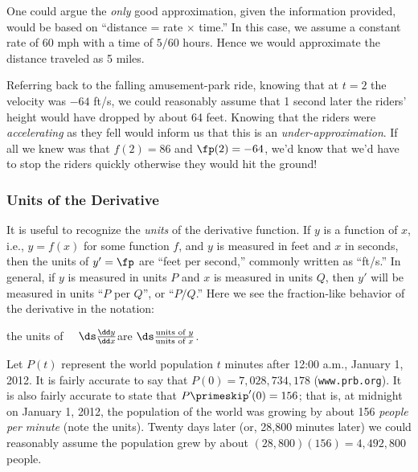 One could argue the \emph{only} good approximation, given the information provided, would be based on ``distance = rate $\times$ time.'' In this case, we assume a constant rate of 60 mph with a time of $5/60$ hours. Hence we would approximate the distance traveled as 5 miles.\bigskip


Referring back to the falling amusement-park ride, knowing that at $t=2$ the velocity was $-64$ ft/s, we could reasonably assume that 1 second later the riders' height would have dropped by about 64 feet. Knowing that the riders were \emph{accelerating} as they fell would inform us that this is an \emph{under-approximation}. If all we knew was that $f(2) = 86$ and $\fp(2) = -64$, we'd know that we'd have to stop the riders quickly otherwise they would hit the ground!

\subsubsection{Units of the Derivative}

It is useful to recognize the \emph{units} of the derivative function. If $y$ is a function of $x$, i.e., $y=f(x)$ for some function $f$, and $y$ is measured in feet and $x$ in seconds, then the units of $y' = \fp$ are ``feet per second,'' commonly written as ``ft/s.'' In general, if $y$ is measured in units $P$ and $x$ is measured in units $Q$, then $y'$ will be measured in units ``$P$ per $Q$'', or ``$P/Q$.'' Here we see the fraction-like behavior of the derivative in the notation:
	\begin{center}
	the units of $\quad\ds \frac{\dd y}{\dd x}$\quad are \quad$\ds \frac{\text{units of $y$}}{\text{units of $x$}}$.
	\end{center}

\begin{example}\label{ex_der_meaning1}
Let $P(t)$ represent the world population $t$ minutes after 12:00 a.m., January 1, 2012. It is fairly accurate to say that $P(0) = 7,028,734,178$ (\texttt{www.prb.org}). It is also fairly accurate to state that $P\primeskip'(0) = 156$; that is, at midnight on January 1, 2012, the population of the world was growing by about 156 \emph{people per minute} (note the units). Twenty days later (or, 28,800 minutes later) we could reasonably assume the population grew by about $(28,800)(156) = 4,492,800$ people.
\end{example}

